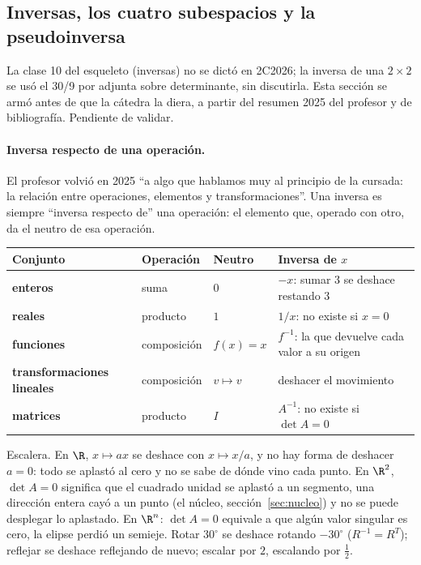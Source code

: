 \subsection{Inversas, los cuatro subespacios y la pseudoinversa}\label{sec:pseudoinversa}

\begin{atencion}[Anticipado]
La clase 10 del esqueleto (inversas) no se dictó en 2C2026; la inversa de una \(2\times2\)
se usó el 30/9 por adjunta sobre determinante, sin discutirla. Esta sección se armó antes
de que la cátedra la diera, a partir del resumen 2025 del profesor y de bibliografía.
Pendiente de validar.
\end{atencion}

\paragraph{Inversa respecto de una operación.} El profesor volvió en 2025 ``a algo que
hablamos muy al principio de la cursada: la relación entre operaciones, elementos y
transformaciones''. Una inversa es siempre ``inversa respecto de'' una operación: el
elemento que, operado con otro, da el neutro de esa operación.

{\small
\begin{center}
\begin{tabularx}{.92\textwidth}{>{\bfseries}l l l Y}
\toprule
Conjunto & Operación & Neutro & Inversa de \(x\)\\
\midrule
enteros & suma & \(0\) & \(-x\): sumar \(3\) se deshace restando \(3\)\\
reales & producto & \(1\) & \(1/x\): no existe si \(x=0\)\\
funciones & composición & \(f(x)=x\) & \(f^{-1}\): la que devuelve cada valor a su origen\\
transformaciones lineales & composición & \(v\mapsto v\) & deshacer el movimiento\\
matrices & producto & \(I\) & \(A^{-1}\): no existe si \(\det A=0\)\\
\bottomrule
\end{tabularx}
\end{center}
}

Escalera. En \(\R\), \(x\mapsto ax\) se deshace con \(x\mapsto x/a\), y no hay forma de
deshacer \(a=0\): todo se aplastó al cero y no se sabe de dónde vino cada punto. En
\(\R^2\), \(\det A=0\) significa que el cuadrado unidad se aplastó a un segmento, una
dirección entera cayó a un punto (el núcleo, sección~\ref{sec:nucleo}) y no se puede
desplegar lo aplastado. En \(\R^n\): \(\det A=0\) equivale a que algún valor singular es
cero, la elipse perdió un semieje. Rotar \(30^\circ\) se deshace rotando \(-30^\circ\)
(\(R^{-1}=R^T\)); reflejar se deshace reflejando de nuevo; escalar por \(2\), escalando
por \(\tfrac12\).

